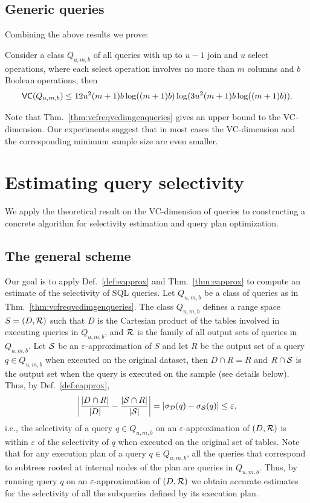 \subsection{Generic queries}\label{sec:vcfreqvcdimgenqueries}
Combining the above results we prove:
\begin{theorem}\label{thm:vcfreqvcdimgenqueries}
Consider a class $Q_{u,m,b}$ of all queries with up to $u-1$ join and $u$ select
operations, where each select operation involves no more than $m$ columns and $b$
Boolean operations, then 
\[
\mathsf{VC}(Q_{u,m,b}) \leq
12u^2(m+1)b\log((m+1)b)\log(3u^2(m+1)b\log((m+1)b)).\]
\end{theorem}

Note that Thm.~\ref{thm:vcfreqvcdimgenqueries} gives an upper bound to the
VC-dimension. Our experiments suggest that in most cases the VC-dimension and
the corresponding minimum sample size are even smaller.

\section{Estimating query selectivity}\label{sec:vcfreqapplications}
We apply the theoretical result on the VC-dimension of queries 
to constructing a concrete
algorithm for selectivity estimation and query plan optimization.

\subsection{The general scheme}
Our goal is to apply Def.~\ref{def:eapprox} and Thm.~\ref{thm:eapprox} to
compute an estimate of the selectivity of SQL queries. Let $Q_{u,m,b}$ be a
class of queries as in Thm.~\ref{thm:vcfreqvcdimgenqueries}.
The class $Q_{u,m,b}$ defines a range space $S=(D,\mathcal{R})$ such that $D$ is the
Cartesian product of the tables involved in executing queries in $Q_{u,m,b}$,
and $\mathcal{R}$ is the family of all output sets of queries in $Q_{u,m,b}$. 
Let ${\cal S}$ be an $\varepsilon$-approximation of $S$ and
let $R$ be the output set
of a query $q\in Q_{u,m,b}$ when executed on the original dataset, then $D\cap
R=R$ and $R\cap {\cal S}$ is the output set when the query is executed on the sample
(see details below). Thus, by Def.~\ref{def:eapprox},
\[
\left|\frac{|D\cap R|}{|D|} - \frac{|{\cal S}\cap R|}{|{\cal S}|}\right|=
|\sigma_{\cal D}(q)-\sigma_{\cal S}(q)| \le\varepsilon,
\]
i.e., the selectivity of a query $q\in Q_{u,m,b}$ on an
$\varepsilon$-approximation of $(D,\mathcal{R})$ is within $\varepsilon$ of the
selectivity of $q$ when executed on the original set of tables.
Note that for any execution plan of a query $q\in Q_{u,m,b}$, all the queries
that correspond to subtrees rooted at internal nodes of the plan are queries in
$Q_{u,m,b}$. Thus, by running query $q$ on an $\varepsilon$-approximation of
$(D,\mathcal{R})$ we obtain accurate estimates for the selectivity of all the
subqueries defined by its execution plan. 
  

